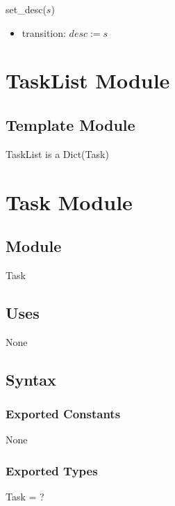 \documentclass[12pt, titlepage]{article}
\begin{document}
\noindent set\_desc($s$)
\begin{itemize}
    \item transition: $desc := s$
\end{itemize}

\newpage

\section*{TaskList Module}

\subsection*{Template Module}
TaskList is a Dict(Task)

\newpage

\section*{Task Module}

\subsection*{Module}
Task

\subsection*{Uses}
None

\subsection* {Syntax}
\subsubsection* {Exported Constants}
None

\subsubsection* {Exported Types}
Task = ?
\end{document}
